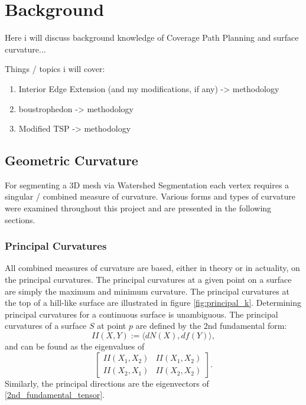 \chapter{Background}\label{background}
Here i will discuss background knowledge of Coverage Path Planning and surface curvature...

Things / topics i will cover:
\begin{enumerate}
	\item Interior Edge Extension (and my modifications, if any) -> methodology
	\item boustrophedon -> methodology
	\item Modified TSP -> methodology
\end{enumerate}


\section{Geometric Curvature}
For segmenting a 3D mesh via Watershed Segmentation each vertex requires a singular / combined measure of curvature.
Various forms and types of curvature were examined throughout this project and are presented in the following sections.

\subsection{Principal Curvatures}
All combined measures of curvature are based, either in theory or in actuality, on the principal curvatures.
The principal curvatures at a given point on a surface are simply the maximum and minimum curvature\cite{DDGAppIntro_17_smooth_k}.
The principal curvatures at the top of a hill-like surface are illustrated in figure \ref{fig:principal_k}.
Determining principal curvatures for a continuous surface is unambiguous.
The principal curvatures of a surface $S$ at point $p$ are defined by the 2nd fundamental form\cite{DiffGeo_curves_surfaces, Basic_diff_geo_of_surfaces, DDGAppIntro_17_smooth_k}:
\begin{equation}
	II(X,Y) := \langle dN(X), df(Y)\rangle,
\end{equation}
and can be found as the eigenvalues of
\begin{equation}\label{2nd_fundamental_tensor}
	\begin{bmatrix}
		II(X_1, X_2) & II(X_1, X_2) \\
		II(X_2, X_1) & II(X_2, X_2)
	\end{bmatrix}.
\end{equation}
Similarly, the principal directions are the eigenvectors of \ref{2nd_fundamental_tensor}.

